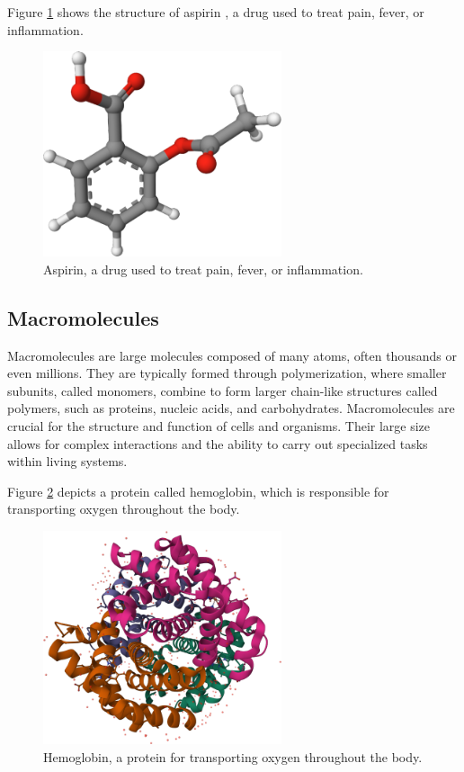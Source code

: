 \documentclass[
  digital,     %
  oneside,     %
  nosansbold,  %
  nocolorbold, %
  lof,         %
  lot,         %
]{fithesis4}
\begin{document}
Figure \ref{fig:aspirin} shows the structure of aspirin \cite{pubchem_aspirin}, a drug used to treat pain, fever, or inflammation.

\begin{figure}[htbp]
  \begin{center}
    \includegraphics[width=7cm]{figures/aspirin.png}
  \end{center}
  \caption{Aspirin, a drug used to treat pain, fever, or inflammation.}
  \label{fig:aspirin}
\end{figure}

\subsection{Macromolecules}

Macromolecules are large molecules composed of many atoms, often thousands or even millions. They are typically formed through polymerization, where smaller subunits, called monomers, combine to form larger chain-like structures called polymers, such as proteins, nucleic acids, and carbohydrates. Macromolecules are crucial for the structure and function of cells and organisms. Their large size allows for complex interactions and the ability to carry out specialized tasks within living systems. \cite{clark2018biology,gu2009structural}

 Figure \ref{fig:hemoglobin} depicts a protein called hemoglobin, which is responsible for transporting oxygen throughout the body.

\begin{figure}[htbp]
  \begin{center}
    \includegraphics[width=7cm]{figures/hemoglobin.png}
  \end{center}
  \caption{Hemoglobin, a protein for transporting oxygen throughout the body.}
  \label{fig:hemoglobin}
\end{figure}
\end{document}
